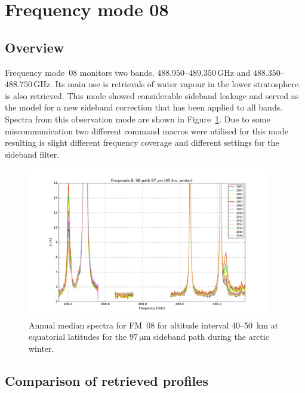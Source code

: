 \section{Frequency mode 08}
\label{sec:fm08}

\subsection{Overview}
\label{sec:fm08:overview}
Frequency mode~08 monitors two bands, $488.950$--$489.350\,\mathrm{GHz}$ and
$488.350$--$488.750\,\mathrm{GHz}$. Its main use is retrievals of water vapour
in the lower stratosphere.  is also retrieved.  This mode showed
considerable sideband leakage and served as the model for a new sideband
correction that has been applied to all bands.  Spectra from this observation
mode are shown in Figure~\ref{fig:spectra:08}.  Due to some miscommunication two different
command macros were utilised for this mode resulting is slight different frequency coverage and 
different settings for the sideband filter.

\begin{figure}[ht]
    \centering
    \includegraphics[width=0.95\textwidth]{../DDS/figures/spectra/fm_08_spectra_winter_97u}
    \caption{Annual median spectra for FM~08 for altitude interval 40--50~km at
        equatorial latitudes for the $97\,\mathrm{\mu m}$ sideband path during
        the arctic winter.
    }\label{fig:spectra:08}
\end{figure}


\subsection{Comparison of retrieved profiles}
\label{sec:fm08:comparison}


